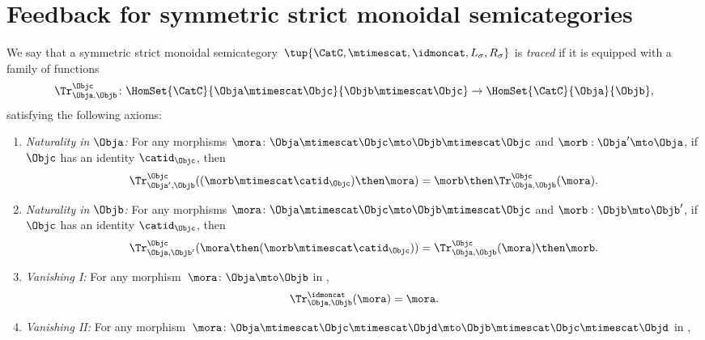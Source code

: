 \section{Feedback for symmetric strict monoidal semicategories}

\begin{ctdefinition}
    \label{def:traced-fun-stack-scat}
    We say that a symmetric strict monoidal semicategory~$\tup{\CatC,\mtimescat, \idmoncat, L_\sigma, R_\sigma}$ is \emph{traced} if it is equipped with a family of functions
    \begin{equation}
        \Tr_{\Obja,\Objb}^\Objc\colon \HomSet{\CatC}{\Obja \mtimescat \Objc}{\Objb\mtimescat \Objc}\to \HomSet{\CatC}{\Obja}{\Objb},
    \end{equation}
    satisfying the following axioms:
    \begin{enumerate}
        \item \emph{Naturality in $\Obja$:} For any morphisms $\mora\colon \Obja\mtimescat \Objc \mto \Objb\mtimescat \Objc$ and $\morb : \Obja' \mto \Obja$, if $\Objc$ has an identity $\catid_\Objc$, then
              \begin{equation}
                  \Tr_{\Obja', \Objb}^\Objc ( (\morb \mtimescat \catid_\Objc) \then \mora) = \morb \then \Tr_{\Obja, \Objb}^\Objc (\mora).
              \end{equation}
        \item \emph{Naturality in $\Objb$:}
              For any morphisms $\mora\colon \Obja\mtimescat \Objc \mto \Objb\mtimescat \Objc$ and $\morb : \Objb \mto \Objb'$, if $\Objc$ has an identity $\catid_\Objc$, then
              \begin{equation}
                  \Tr_{\Obja, \Objb'}^\Objc ( \mora \then (\morb \mtimescat \catid_\Objc) ) =  \Tr_{\Obja, \Objb}^\Objc (\mora) \then \morb.
              \end{equation}
        \item \emph{Vanishing I:}
              For any morphism~$\mora \colon \Obja\mto \Objb$ in \CatC,
              \begin{equation}
                  \label{eq:semicat-trace-vanishing_1}
                  \Tr_{\Obja,\Objb}^\idmoncat (\mora)=\mora.
              \end{equation}
        \item \emph{Vanishing II:}
              For any morphism~$\mora \colon \Obja\mtimescat \Objc \mtimescat \Objd \mto \Objb\mtimescat \Objc \mtimescat \Objd$ in \CatC,

\end{enumerate}
\end{ctdefinition}
